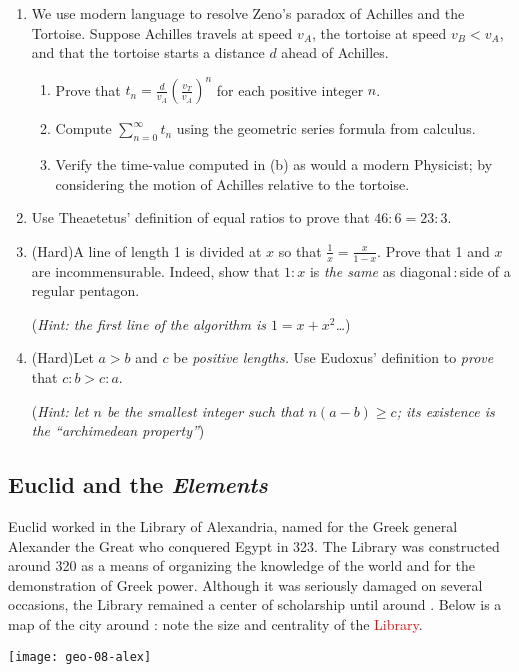 \begin{exercises}{}{}
\begin{enumerate}
		
		\item\label{exs:zenoachilles} We use modern language to resolve Zeno's paradox of Achilles and the Tortoise. Suppose Achilles travels at speed $v_A$, the tortoise at speed $v_B<v_A$, and that the tortoise starts a distance $d$ ahead of Achilles.
		\begin{enumerate}
		  \item Prove that $t_n=\frac d{v_A}\left(\frac{v_T}{v_A}\right)^{n}$ for each positive integer $n$.
		  \item Compute $\sum_{n=0}^\infty t_n$ using the geometric series formula from calculus.
		  \item Verify the time-value computed in (b) as would a modern Physicist; by considering the motion of Achilles relative to the tortoise.
		\end{enumerate} 
		
	  
	  \item%
		Use Theaetetus' definition of equal ratios to prove that $46:6=23:3$.
	  
	  
	  \item%
	  (Hard)\lstsp A line of length 1 is divided at $x$ so that $\frac 1x=\frac x{1-x}$. Prove that 1 and $x$ are incommensurable. Indeed, show that $1:x$ is \emph{the same} as diagonal\,:\,side of a regular pentagon.\par
	  (\emph{Hint: the first line of the algorithm is $1=x+x^2$\ldots})
	  
	  
	  \item%
	  (Hard)\lstsp Let $a>b$ and $c$ be \emph{positive lengths.} Use Eudoxus' definition to \emph{prove} that $c:b>c:a$.\par
	  (\emph{Hint: let $n$ be the smallest integer such that $n(a-b)\ge c$; its existence is the ``archimedean property''})
	\end{enumerate}
\end{exercises}


\clearpage



\subsection{Euclid and the \emph{Elements}}

\begin{minipage}[t]{0.70\linewidth}\vspace{-8pt}
	Euclid worked in the Library of Alexandria, named for the Greek general Alexander the Great who conquered Egypt in 323\BC. The Library was constructed around 320\BC{} as a means of organizing the knowledge of the world and for the demonstration of Greek power. Although it was seriously damaged on several occasions, the Library remained a center of scholarship until around . Below is a map of the city around : note the size and centrality of the \textcolor{red}{Library}.
\end{minipage}
\hfill
\begin{minipage}[t]{0.29\linewidth}\vspace{-25pt}
	\flushright
	\texttt{[image: geo-08-alex]}
\end{minipage}\par

